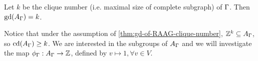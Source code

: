 \begin{theorem}
    \label{thm:gd-of-RAAG-clique-number}
    Let \(k\) be the clique number (i.e. maximal size of complete subgraph) of \(\Gamma\). Then \(\operatorname{gd}({A_\Gamma})=k\).
\end{theorem}

\begin{remark}
    Notice that under the assumption of \cref{thm:gd-of-RAAG-clique-number}, \(\mathbb{Z}^k \subseteq A_\Gamma\), so \(\operatorname{cd}({A_\Gamma}) \geq k\). We are interested in the subgroups of \(A_\Gamma\) and we will investigate the map \(\phi_\Gamma : A_\Gamma \to \mathbb{Z}\), defined by \(v\mapsto 1, \forall v\in V\).
\end{remark}